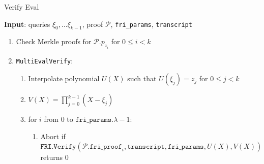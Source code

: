 \begin{algorithm}[H]
\caption{Verify Eval}
\textbf{Input}: queries $\xi_0, \dots \xi_{k - 1}$, proof $\mathcal{P}$, \texttt{fri\_params}, \texttt{transcript}
\begin{enumerate}
	\item Check Merkle proofs for $\mathcal{P}.p_{z_i}$ for $0 \leq i < k$
	\item \texttt{MultiEvalVerify}:
	\begin{enumerate}
		\item Interpolate polynomial $U(X)$ such that $U(\xi_j) = z_j$ for $0 \leq j < k$
		\item $V(X) = \prod_{j = 0}^{k - 1}(X - \xi_j)$
		\item for $i$ from $0$ to $\texttt{fri\_params}.\lambda - 1$:
		\begin{enumerate}
			\item Abort if $\texttt{FRI.Verify}(\mathcal{P}.\texttt{fri\_proof}_i, \texttt{transcript}, \texttt{fri\_params}, U(X), V(X))$ returns $0$
		\end{enumerate}
	\end{enumerate}
\end{enumerate}
\end{algorithm}

